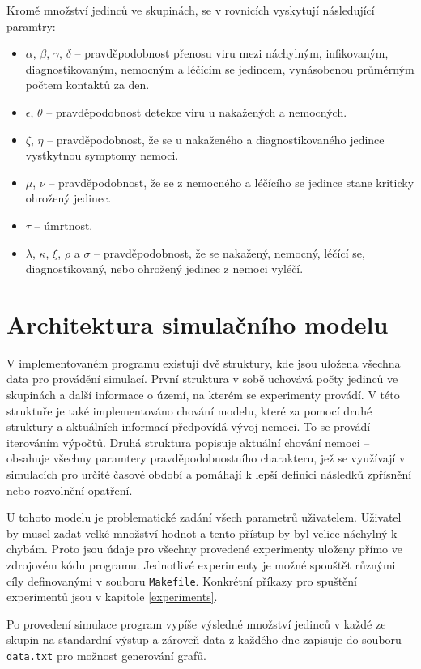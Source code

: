 \documentclass[a4paper,11pt]{article}
\begin{document}
	Kromě množství jedinců ve skupinách, se v rovnicích vyskytují následující paramtry:
	\begin{itemize}
		\item $\alpha$, $\beta$, $\gamma$, $\delta$ -- pravděpodobnost přenosu viru mezi náchylným, infikovaným, diagnostikovaným, nemocným a léčícím se jedincem, vynásobenou průměrným počtem kontaktů za den.
		\item $\epsilon$, $\theta$ -- pravděpodobnost detekce viru u nakažených a nemocných.
		\item $\zeta$, $\eta$ -- pravděpodobnost, že se u nakaženého a diagnostikovaného jedince vystkytnou symptomy nemoci.
		\item $\mu$, $\nu$ -- pravděpodobnost, že se z nemocného a léčícího se jedince stane kriticky ohrožený jedinec.
		\item $\tau$ -- úmrtnost.
		\item $\lambda$, $\kappa$, $\xi$, $\rho$ a $\sigma$ -- pravděpodobnost, že se nakažený, nemocný, léčící se, diagnostikovaný, nebo ohrožený jedinec z nemoci vyléčí.
	\end{itemize}
		
	\section{Architektura simulačního modelu}
		V implementovaném programu existují dvě struktury, kde jsou uložena všechna data pro provádění simulací. První struktura v sobě uchovává počty jedinců ve skupinách a další informace o území, na kterém se experimenty provádí. V této struktuře je také implementováno chování modelu, které za pomocí druhé struktury a aktuálních informací předpovídá vývoj nemoci. To se provádí iterováním výpočtů. Druhá struktura popisuje aktuální chování nemoci -- obsahuje všechny paramtery pravděpodobnostního charakteru, jež se využívají v simulacích pro určité časové období a pomáhají k lepší definici následků zpřísnění nebo rozvolnění opatření.
		
		U tohoto modelu je problematické zadání všech parametrů uživatelem. Uživatel by musel zadat velké množství hodnot a tento přístup by byl velice náchylný k chybám. Proto jsou údaje pro všechny provedené experimenty uloženy přímo ve zdrojovém kódu programu. Jednotlivé experimenty je možné spouštět různými cíly definovanými v souboru \texttt{Makefile}. Konkrétní příkazy pro spuštění experimentů jsou v kapitole \ref{experiments}.
		
		Po provedení simulace program vypíše výsledné množství jedinců v každé ze skupin na standardní výstup a zároveň data z každého dne zapisuje do souboru \texttt{data.txt} pro možnost generování grafů.
		
\end{document}
